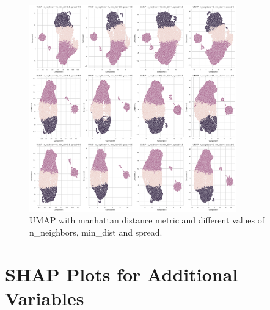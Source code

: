 \documentclass{article}
\begin{document}
\begin{figure}[H]
    \centering
    \includegraphics[width=0.8\textwidth]{figures/output2.png}
    \caption{UMAP with manhattan distance metric and different values of n\_neighbors, min\_dist and spread.}
    \label{fig:umap2}
\end{figure}

\section{SHAP Plots for Additional Variables}
\end{document}
